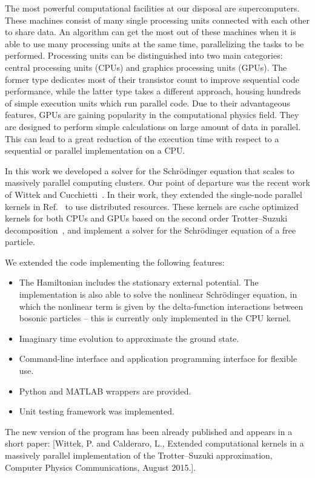 The most powerful computational facilities at our disposal are supercomputers. These machines consist of many single processing units connected with each other to share data. An algorithm can get the most out of these machines when it is able to use many processing units at the same time, parallelizing the tasks to be performed. Processing units can be distinguished into two main categories: central processing units (CPUs) and graphics processing units (GPUs). The former type dedicates most of their transistor count to improve sequential code performance, while the latter type takes a different approach, housing hundreds of simple execution units which run parallel code. Due to their advantageous features, GPUs are gaining popularity in the computational physics field. They are designed to perform simple calculations on large amount of data in parallel. This can lead to a great reduction of the execution time with respect to a sequential or parallel implementation on a CPU.


In this work we developed a solver for the Schr\"odinger equation that scales to	massively parallel computing clusters. Our point of departure was the recent work of Wittek and Cucchietti~\citep{Wittek20131165}. In their work, they extended the single-node parallel kernels in Ref.~\citep{bederian2011boosting} to use distributed resources. These kernels are cache optimized kernels for both CPUs and GPUs based on the second order Trotter--Suzuki decomposition~\citep{Suzuki1992387}, and implement a solver for the Schr\"odinger equation of a free particle. 

We extended the code implementing the following features:
\begin{itemize}
\item The Hamiltonian includes the stationary external potential. The implementation is also able to solve the nonlinear Schr\"odinger equation, in which the nonlinear term is given by the delta-function interactions between bosonic particles -- this is currently only implemented in the CPU kernel.

\item Imaginary time evolution to approximate the ground state.

\item Command-line interface and application programming interface for flexible use.

\item Python and MATLAB wrappers are provided.

\item Unit testing framework was implemented.

\end{itemize}
The new version of the program has been already published and appears in a short paper: [Wittek, P. and Calderaro, L., Extended computational kernels in a massively parallel implementation of the Trotter--Suzuki approximation, Computer Physics Communications, August 2015.]. 

